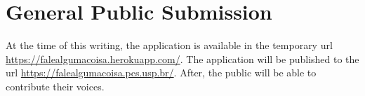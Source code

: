 \chapter{General Public Submission}
\label{chap:proposal-public-submission}

At the time of this writing, the application is available in the temporary url \url{https://falealgumacoisa.herokuapp.com/}. The application will be published to the url \url{https://falealgumacoisa.pcs.usp.br/}. After, the public will be able to contribute their voices.
